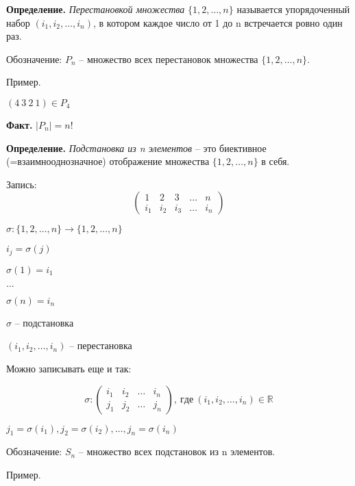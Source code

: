 \textbf{Определение.} \textit{Перестановкой множества} $\{ 1, 2, \dots, n \} $ называется упорядоченный набор $(i_1, i_2, \dots, i_n)$, в котором каждое число от 1 до n встречается ровно один раз.

Обозначение: $P_n$ -- множество всех перестановок множества $\{ 1, 2, \dots, n \} $. 

\vspace{\baselineskip}
Пример. 

$(4 \ 3 \ 2 \ 1) \in P_4$ 

\vspace{\baselineskip}
\textbf{Факт.} $|P_n| = n!$

\vspace{\baselineskip}
\textbf{Определение.} \textit{Подстановка из n элементов} -- это биективное (=взаимнооднозначное) отображение множества $\{ 1, 2, \dots, n \} $ в себя.

Запись: \[\begin{pmatrix} 1 & 2 & 3 & \dots & n \\
i_1 & i_2 & i_3 & \dots & i_n \end{pmatrix} \]

$\sigma : \{ 1, 2, \dots, n \} \rightarrow \{ 1, 2, \dots, n \}$

\vspace{\baselineskip}
$i_j = \sigma (j)$ 

\vspace{\baselineskip}
$\sigma (1) = i_1$

$\dots$

$\sigma (n) = i_n$

\vspace{\baselineskip}
$\sigma$ -- подстановка

$(i_1, i_2, \dots, i_n)$ -- перестановка

\vspace{\baselineskip}
Можно записывать еще и так:

\[ \sigma : \begin{pmatrix} i_1 & i_2 & \dots & i_n \\ j_1 & j_2 & \dots & j_n \end{pmatrix}, \ где \ (i_1, i_2, \dots, i_n) \in \mathbb{R}
\]

$j_1 = \sigma (i_1), j_2 = \sigma (i_2), \dots, j_n = \sigma (i_n)$

\vspace{\baselineskip}
Обозначение: $S_n$ -- множество всех подстановок из n элементов.

\vspace{\baselineskip}
Пример.

